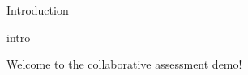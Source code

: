 
\begin{edXchapter}{Introduction}

%

\begin{edXtext}{intro}

Welcome to the collaborative assessment demo!


\end{edXtext}
%
%

\end{edXchapter}
